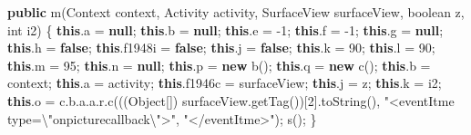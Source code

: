 \documentclass[
]{article}
\newenvironment{Shaded}{}{}
\newcommand{\BuiltInTok}[1]{\textcolor[rgb]{0.00,0.50,0.00}{#1}}
\newcommand{\DataTypeTok}[1]{\textcolor[rgb]{0.56,0.13,0.00}{#1}}
\newcommand{\DecValTok}[1]{\textcolor[rgb]{0.25,0.63,0.44}{#1}}
\newcommand{\FunctionTok}[1]{\textcolor[rgb]{0.02,0.16,0.49}{#1}}
\newcommand{\KeywordTok}[1]{\textcolor[rgb]{0.00,0.44,0.13}{\textbf{#1}}}
\newcommand{\NormalTok}[1]{#1}
\newcommand{\OperatorTok}[1]{\textcolor[rgb]{0.40,0.40,0.40}{#1}}
\newcommand{\SpecialCharTok}[1]{\textcolor[rgb]{0.25,0.44,0.63}{#1}}
\newcommand{\StringTok}[1]{\textcolor[rgb]{0.25,0.44,0.63}{#1}}
\begin{document}
\begin{Shaded}
\begin{Highlighting}[]
    \KeywordTok{public} \FunctionTok{m}\OperatorTok{(}\BuiltInTok{Context}\NormalTok{ context}\OperatorTok{,}\NormalTok{ Activity activity}\OperatorTok{,}\NormalTok{ SurfaceView surfaceView}\OperatorTok{,} \DataTypeTok{boolean}\NormalTok{ z}\OperatorTok{,} \DataTypeTok{int}\NormalTok{ i2}\OperatorTok{)} \OperatorTok{\{}
        \KeywordTok{this}\OperatorTok{.}\FunctionTok{a} \OperatorTok{=} \KeywordTok{null}\OperatorTok{;}
        \KeywordTok{this}\OperatorTok{.}\FunctionTok{b} \OperatorTok{=} \KeywordTok{null}\OperatorTok{;}
        \KeywordTok{this}\OperatorTok{.}\FunctionTok{e} \OperatorTok{=} \OperatorTok{{-}}\DecValTok{1}\OperatorTok{;}
        \KeywordTok{this}\OperatorTok{.}\FunctionTok{f} \OperatorTok{=} \OperatorTok{{-}}\DecValTok{1}\OperatorTok{;}
        \KeywordTok{this}\OperatorTok{.}\FunctionTok{g} \OperatorTok{=} \KeywordTok{null}\OperatorTok{;}
        \KeywordTok{this}\OperatorTok{.}\FunctionTok{h} \OperatorTok{=} \KeywordTok{false}\OperatorTok{;}
        \KeywordTok{this}\OperatorTok{.}\FunctionTok{f1948i} \OperatorTok{=} \KeywordTok{false}\OperatorTok{;}
        \KeywordTok{this}\OperatorTok{.}\FunctionTok{j} \OperatorTok{=} \KeywordTok{false}\OperatorTok{;}
        \KeywordTok{this}\OperatorTok{.}\FunctionTok{k} \OperatorTok{=} \DecValTok{90}\OperatorTok{;}
        \KeywordTok{this}\OperatorTok{.}\FunctionTok{l} \OperatorTok{=} \DecValTok{90}\OperatorTok{;}
        \KeywordTok{this}\OperatorTok{.}\FunctionTok{m} \OperatorTok{=} \DecValTok{95}\OperatorTok{;}
        \KeywordTok{this}\OperatorTok{.}\FunctionTok{n} \OperatorTok{=} \KeywordTok{null}\OperatorTok{;}
        \KeywordTok{this}\OperatorTok{.}\FunctionTok{p} \OperatorTok{=} \KeywordTok{new} \FunctionTok{b}\OperatorTok{();}
        \KeywordTok{this}\OperatorTok{.}\FunctionTok{q} \OperatorTok{=} \KeywordTok{new} \FunctionTok{c}\OperatorTok{();}
        \KeywordTok{this}\OperatorTok{.}\FunctionTok{b} \OperatorTok{=}\NormalTok{ context}\OperatorTok{;}
        \KeywordTok{this}\OperatorTok{.}\FunctionTok{a} \OperatorTok{=}\NormalTok{ activity}\OperatorTok{;}
        \KeywordTok{this}\OperatorTok{.}\FunctionTok{f1946c} \OperatorTok{=}\NormalTok{ surfaceView}\OperatorTok{;}
        \KeywordTok{this}\OperatorTok{.}\FunctionTok{j} \OperatorTok{=}\NormalTok{ z}\OperatorTok{;}
        \KeywordTok{this}\OperatorTok{.}\FunctionTok{k} \OperatorTok{=}\NormalTok{ i2}\OperatorTok{;}
        \KeywordTok{this}\OperatorTok{.}\FunctionTok{o} \OperatorTok{=}\NormalTok{ c}\OperatorTok{.}\FunctionTok{b}\OperatorTok{.}\FunctionTok{a}\OperatorTok{.}\FunctionTok{a}\OperatorTok{.}\FunctionTok{r}\OperatorTok{.}\FunctionTok{c}\OperatorTok{(((}\BuiltInTok{Object}\OperatorTok{[])}\NormalTok{ surfaceView}\OperatorTok{.}\FunctionTok{getTag}\OperatorTok{())[}\DecValTok{2}\OperatorTok{].}\FunctionTok{toString}\OperatorTok{(),} \StringTok{"\textless{}eventItme type=}\SpecialCharTok{\textbackslash{}"}\StringTok{onpicturecallback}\SpecialCharTok{\textbackslash{}"}\StringTok{\textgreater{}"}\OperatorTok{,} \StringTok{"\textless{}/eventItme\textgreater{}"}\OperatorTok{);}
        \FunctionTok{s}\OperatorTok{();}
    \OperatorTok{\}}


\end{Highlighting}
\end{Shaded}
\end{document}
